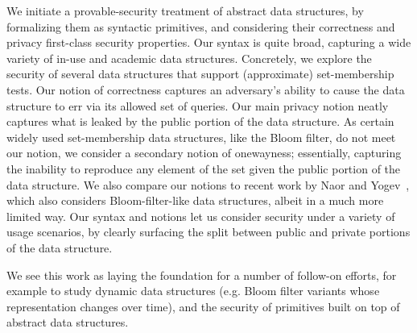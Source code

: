 We initiate a provable-security treatment of abstract data structures, by formalizing them as syntactic primitives, and considering their correctness and privacy first-class security properties.  Our syntax is quite broad, capturing a wide variety of in-use and academic data structures.  Concretely, we explore the security of several data structures that support (approximate) set-membership tests.  Our notion of correctness captures an adversary's ability to cause the data structure to err via its allowed set of queries.  Our main privacy notion neatly captures what is leaked by the public portion of the data structure.  As certain widely used set-membership data structures, like the Bloom filter, do not meet our notion, we consider a secondary notion of onewayness; essentially, capturing the inability to reproduce any element of the set given the public portion of the data structure.  We also compare our notions to recent work by Naor and Yogev~\cite{naor2015bloom}, which also considers Bloom-filter-like data structures, albeit in a much more limited way.  Our syntax and notions let us consider security under a variety of usage scenarios, by clearly surfacing the split between public and private portions of the data structure.

We see this work as laying the foundation for a number of follow-on efforts, for example to study dynamic data structures (e.g. Bloom filter variants whose representation changes over time), and the security of primitives built on top of abstract data structures.
